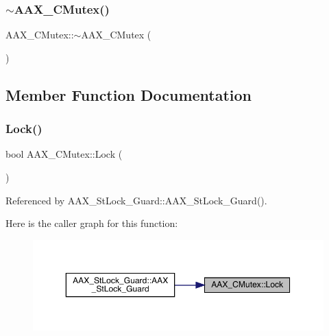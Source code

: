 \mbox{\label{a01501_a0328e4cd9b148b80d477f3275ce3ff2a}} 
\subsubsection{\texorpdfstring{$\sim$AAX\_CMutex()}{~AAX\_CMutex()}}
{\footnotesize\ttfamily A\+A\+X\+\_\+\+C\+Mutex\+::$\sim$\+A\+A\+X\+\_\+\+C\+Mutex (\begin{DoxyParamCaption}{ }\end{DoxyParamCaption})}



\subsection{Member Function Documentation}
\mbox{\label{a01501_a99babc9bed7ae95c36015635f4c500df}} 
\subsubsection{\texorpdfstring{Lock()}{Lock()}}
{\footnotesize\ttfamily bool A\+A\+X\+\_\+\+C\+Mutex\+::\+Lock (\begin{DoxyParamCaption}{ }\end{DoxyParamCaption})}



Referenced by A\+A\+X\+\_\+\+St\+Lock\+\_\+\+Guard\+::\+A\+A\+X\+\_\+\+St\+Lock\+\_\+\+Guard().

Here is the caller graph for this function\+:
\nopagebreak
\begin{figure}[H]
\begin{center}
\leavevmode
\includegraphics[width=350pt]{a01501_a99babc9bed7ae95c36015635f4c500df_icgraph}
\end{center}
\end{figure}
\mbox{\label{a01501_a8c25bbd0e6030325a7965f8453d96323}} 
